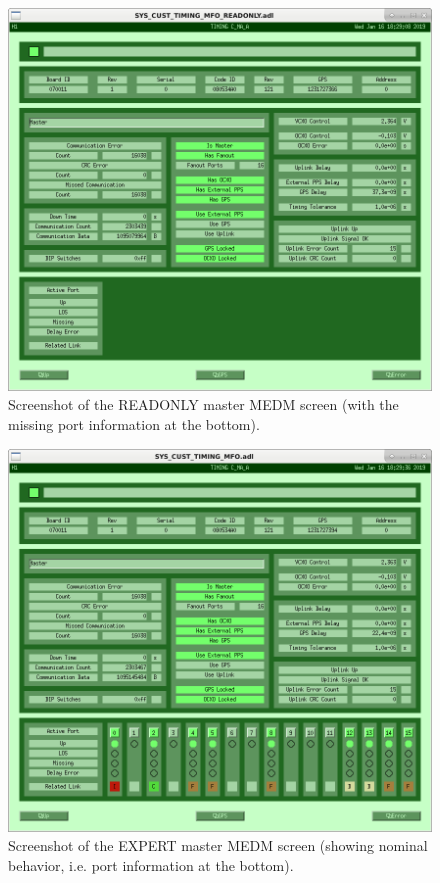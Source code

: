 \documentclass{article}
\begin{document}
\begin{figure}
  \includegraphics[width=\linewidth]{img/2019-01-16_lho-timing-master-readonly.png}
  \caption{Screenshot of the READONLY master MEDM screen (with the missing port information at the bottom).}
  \label{fig:medm-readonly}
\end{figure}
\begin{figure}
  \includegraphics[width=\linewidth]{img/2019-01-16_lho-timing-master-expert.png}
  \caption{Screenshot of the EXPERT master MEDM screen (showing nominal behavior, i.e. port information at the bottom).}
  \label{fig:medm-expert}
\end{figure}
\clearpage
\end{document}
